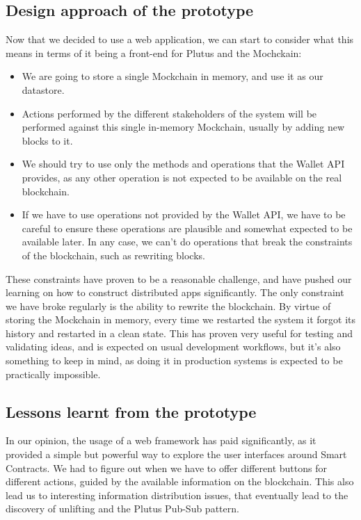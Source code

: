 \documentclass{article}
\begin{document}
\subsection{Design approach of the prototype}
Now that we decided to use a web application, we can start to consider what this means in terms of it being a front-end for Plutus and the Mochckain:

\begin{itemize}
  \item We are going to store a single Mockchain in memory, and use it as our datastore.
  \item Actions performed by the different stakeholders of the system will be performed against this single in-memory Mockchain, usually by adding new blocks to it.
  \item We should try to use only the methods and operations that the Wallet API provides, as any other operation is not expected to be available on the real blockchain.
  \item If we have to use operations not provided by the Wallet API, we have to be careful to ensure these operations are plausible and somewhat expected to be available later. In any case, we can't do operations that break the constraints of the blockchain, such as rewriting blocks.
\end{itemize}

These constraints have proven to be a reasonable challenge, and have pushed our learning on how to construct distributed apps significantly. The only constraint we have broke regularly is the ability to rewrite the blockchain. By virtue of storing the Mockchain in memory, every time we restarted the system it forgot its history and restarted in a clean state. This has proven very useful for testing and validating ideas, and is expected on usual development workflows, but it's also something to keep in mind, as doing it in production systems is expected to be practically impossible.

\subsection{Lessons learnt from the prototype}
In our opinion, the usage of a web framework has paid significantly, as it provided a simple but powerful way to explore the user interfaces around Smart Contracts. We had to figure out when we have to offer different buttons for different actions, guided by the available information on the blockchain. This also lead us to interesting information distribution issues, that eventually lead to the discovery of unlifting and the Plutus Pub-Sub pattern\cite{pub-sub-paper}.
\end{document}
